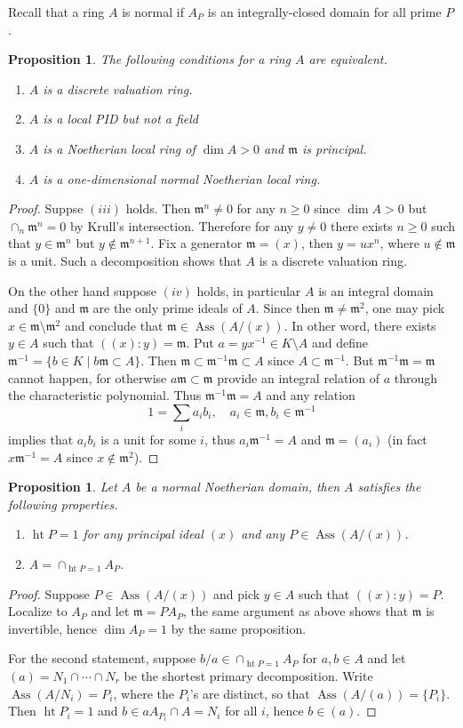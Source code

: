 \documentclass[leqno]{amsart}
\DeclareMathOperator{\hht}{ht}
\DeclareMathOperator{\Ass}{Ass}
\newcommand{\1}{\mathbf{1}}
\newcommand{\fm}{\mathfrak m}
\newtheorem{prop}[thm]{Proposition}
\theoremstyle{definition}
\theoremstyle{remark}
\begin{document}
Recall that a ring $A$ is normal if 
$A_P$ is an integrally-closed domain for all prime $P$.
\begin{prop}
	The following conditions for a ring $A$
	are equivalent.
	\begin{enumerate}[label=(\roman*)]
		\item $A$ is a discrete valuation ring.
		\item $A$ is a local PID but not a field
		\item $A$ is a Noetherian local ring
			of $\dim A>0$ and $\fm$ is principal.
		\item  $A$ is a one-dimensional normal 
			Noetherian local ring.
	\end{enumerate}
\end{prop}
\begin{proof}
	Suppse $(iii)$ holds.
	Then $\fm^n\neq 0$ for any  $n\geq 0$ since  $\dim A>0$
	but $\cap_n\fm^n=0$ by Krull's intersection.
	Therefore for any  $y\neq0$ there exists  $n\geq 0$
	such that  $y\in \fm^n$ but  $y\notin \fm^{n+1}$.
	Fix a generator $\fm=(x)$,
	then $y=ux^n$, where $u\notin\fm$ is a unit.
	Such a decomposition shows that 
	$A$ is a discrete valuation ring.
	
	On the other hand suppose $(iv)$ holds,
	in particular $A$ is an integral domain
	and $\{0\}$ and $\fm$ are the only prime ideals of  $A$.
	Since then $\fm\neq\fm^2$, 
	one may pick $x\in \fm\setminus\fm^2$ and 
	conclude that $\fm\in \Ass(A/(x))$.
	In other word, there exists $y\in A$ such that
	$((x):y)=\fm$.
	Put  $a=yx^{-1}\in K\setminus A$ and define
	$\fm^{-1}=\{b\in K\mid b\fm\subset A\}$.
	Then $\fm\subset \fm^{-1}\fm\subset A$ 
	since $A\subset \fm^{-1}$.
	But $\fm^{-1}\fm=\fm$ cannot happen,
	for otherwise $a\fm\subset \fm$
	provide an integral relation of $a$
	through the characteristic polynomial.
	Thus $\fm^{-1}\fm=A$ and any relation 
	\[
	1=\sum_{i}a_ib_i,\quad a_i\in\fm, b_i\in \fm^{-1}
	\]
	implies that $a_ib_i$ is a unit for some  $i$,
	thus  $a_i\fm^{-1}=A$ and $\fm=(a_i)$
	(in fact $x\fm^{-1}=A$ since $x\notin\fm^2$).
\end{proof}
\begin{prop}
	Let $A$ be a normal Noetherian domain,
	then $A$ satisfies the following properties.
	\begin{enumerate}
		\item $\hht P=1$ for any principal ideal $(x)$
			and any $P\in \Ass(A/(x))$.
		\item $A=\cap_{\hht P=1}A_P$.
	\end{enumerate}
\end{prop}
\begin{proof}
	Suppose $P\in \Ass(A/(x))$ and pick  
	$y\in A$ such that $((x):y)=P$.
	Localize to $A_P$ and let $\fm=PA_P$,
	the same argument as above shows that
	$\fm$ is invertible, 
	hence  $\dim A_P=1$
	by the same proposition.

	For the second statement,
	suppose $b/a\in \cap_{\hht P=1}A_P$ for $a,b\in A$
	and let $(a)=N_1\cap\cdots\cap N_r$
	be the shortest primary decomposition.
	Write $\Ass(A/N_i)={P_i}$,
	where the $P_i$'s are distinct,
	so that $\Ass(A/(a))=\{P_i\}$.
	Then $\hht P_i=1$ and
	$b\in aA_{P_i}\cap A=N_i$ for all $i$,
	hence $b\in(a)$.
\end{proof}
\end{document}
